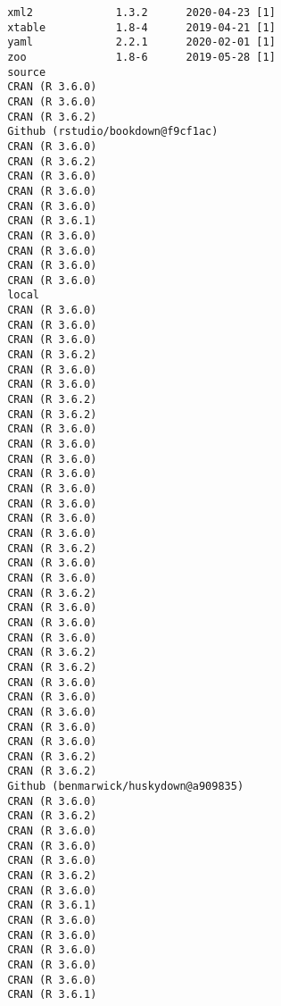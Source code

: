 \documentclass [11pt, proquest] {uwthesis}[2015/03/03]
\begin{document}
\begin{verbatim}
 xml2             1.3.2      2020-04-23 [1]
 xtable           1.8-4      2019-04-21 [1]
 yaml             2.2.1      2020-02-01 [1]
 zoo              1.8-6      2019-05-28 [1]
 source                               
 CRAN (R 3.6.0)                       
 CRAN (R 3.6.0)                       
 CRAN (R 3.6.2)                       
 Github (rstudio/bookdown@f9cf1ac)    
 CRAN (R 3.6.0)                       
 CRAN (R 3.6.2)                       
 CRAN (R 3.6.0)                       
 CRAN (R 3.6.0)                       
 CRAN (R 3.6.0)                       
 CRAN (R 3.6.1)                       
 CRAN (R 3.6.0)                       
 CRAN (R 3.6.0)                       
 CRAN (R 3.6.0)                       
 CRAN (R 3.6.0)                       
 local                                
 CRAN (R 3.6.0)                       
 CRAN (R 3.6.0)                       
 CRAN (R 3.6.0)                       
 CRAN (R 3.6.2)                       
 CRAN (R 3.6.0)                       
 CRAN (R 3.6.0)                       
 CRAN (R 3.6.2)                       
 CRAN (R 3.6.2)                       
 CRAN (R 3.6.0)                       
 CRAN (R 3.6.0)                       
 CRAN (R 3.6.0)                       
 CRAN (R 3.6.0)                       
 CRAN (R 3.6.0)                       
 CRAN (R 3.6.0)                       
 CRAN (R 3.6.0)                       
 CRAN (R 3.6.0)                       
 CRAN (R 3.6.2)                       
 CRAN (R 3.6.0)                       
 CRAN (R 3.6.0)                       
 CRAN (R 3.6.2)                       
 CRAN (R 3.6.0)                       
 CRAN (R 3.6.0)                       
 CRAN (R 3.6.0)                       
 CRAN (R 3.6.2)                       
 CRAN (R 3.6.2)                       
 CRAN (R 3.6.0)                       
 CRAN (R 3.6.0)                       
 CRAN (R 3.6.0)                       
 CRAN (R 3.6.0)                       
 CRAN (R 3.6.0)                       
 CRAN (R 3.6.2)                       
 CRAN (R 3.6.2)                       
 Github (benmarwick/huskydown@a909835)
 CRAN (R 3.6.0)                       
 CRAN (R 3.6.2)                       
 CRAN (R 3.6.0)                       
 CRAN (R 3.6.0)                       
 CRAN (R 3.6.0)                       
 CRAN (R 3.6.2)                       
 CRAN (R 3.6.0)                       
 CRAN (R 3.6.1)                       
 CRAN (R 3.6.0)                       
 CRAN (R 3.6.0)                       
 CRAN (R 3.6.0)                       
 CRAN (R 3.6.0)                       
 CRAN (R 3.6.0)                       
 CRAN (R 3.6.1)                       

\end{verbatim}
\end{document}
